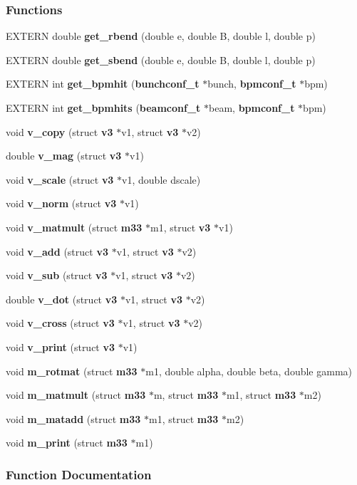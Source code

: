 \subsubsection*{Functions}
\begin{CompactItemize}
\item 
EXTERN double {\bf get\_\-rbend} (double e, double B, double l, double p)
\item 
EXTERN double {\bf get\_\-sbend} (double e, double B, double l, double p)
\item 
EXTERN int {\bf get\_\-bpmhit} ({\bf bunchconf\_\-t} $\ast$bunch, {\bf bpmconf\_\-t} $\ast$bpm)
\item 
EXTERN int {\bf get\_\-bpmhits} ({\bf beamconf\_\-t} $\ast$beam, {\bf bpmconf\_\-t} $\ast$bpm)
\item 
void {\bf v\_\-copy} (struct {\bf v3} $\ast$v1, struct {\bf v3} $\ast$v2)
\item 
double {\bf v\_\-mag} (struct {\bf v3} $\ast$v1)
\item 
void {\bf v\_\-scale} (struct {\bf v3} $\ast$v1, double dscale)
\item 
void {\bf v\_\-norm} (struct {\bf v3} $\ast$v1)
\item 
void {\bf v\_\-matmult} (struct {\bf m33} $\ast$m1, struct {\bf v3} $\ast$v1)
\item 
void {\bf v\_\-add} (struct {\bf v3} $\ast$v1, struct {\bf v3} $\ast$v2)
\item 
void {\bf v\_\-sub} (struct {\bf v3} $\ast$v1, struct {\bf v3} $\ast$v2)
\item 
double {\bf v\_\-dot} (struct {\bf v3} $\ast$v1, struct {\bf v3} $\ast$v2)
\item 
void {\bf v\_\-cross} (struct {\bf v3} $\ast$v1, struct {\bf v3} $\ast$v2)
\item 
void {\bf v\_\-print} (struct {\bf v3} $\ast$v1)
\item 
void {\bf m\_\-rotmat} (struct {\bf m33} $\ast$m1, double alpha, double beta, double gamma)
\item 
void {\bf m\_\-matmult} (struct {\bf m33} $\ast$m, struct {\bf m33} $\ast$m1, struct {\bf m33} $\ast$m2)
\item 
void {\bf m\_\-matadd} (struct {\bf m33} $\ast$m1, struct {\bf m33} $\ast$m2)
\item 
void {\bf m\_\-print} (struct {\bf m33} $\ast$m1)
\end{CompactItemize}


\subsubsection{Function Documentation}

